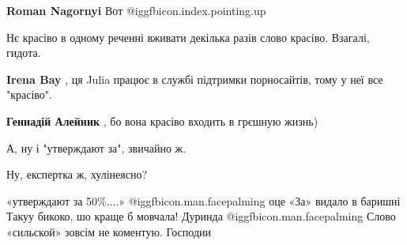 \begin{itemize}
\begin{itemize}
\textbf{Roman Nagornyi} Вот
@igg{fbicon.index.pointing.up}
\end{itemize}

 
Нє красіво в одному реченні вживати декілька разів слово красіво. Взагалі, гидота.

\begin{itemize}
 
\textbf{Irena Bay} , ця Julia працює в службі підтримки порносайтів, тому у неї все "красіво".

 
\textbf{Геннадій Алейник} , бо вона красіво входить в грєшную жизнь)
\end{itemize}

 
А, ну і "утверждают за", звичайно ж.

 

Ну, експертка ж, хулінеясно?

 

«утверждают за 50\%....» @igg{fbicon.man.facepalming}  оце «За» видало в баришні Такуу бикоко, шо
краще б мовчала! Дуринда @igg{fbicon.man.facepalming}  Слово «сильской» зовсім не коментую. Господии


\end{itemize}

